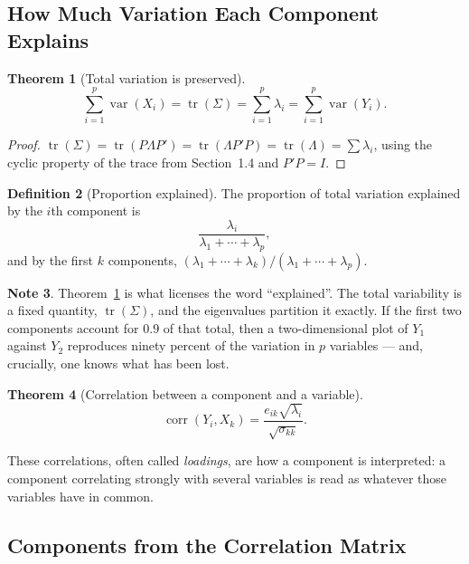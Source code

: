 \documentclass[11pt,a4paper]{article}
\theoremstyle{definition}
\newtheorem{thm}{Theorem}[section]
\newtheorem{defn}[thm]{Definition}
\newtheorem{note}[thm]{Note}
\begin{document}
\subsection{How Much Variation Each Component Explains}

\begin{thm}[Total variation is preserved]
\label{thm:pcatrace}
$$\sum^{p}_{i=1}\operatorname{var}(X_i)
= \operatorname{tr}(\Sigma)
= \sum^{p}_{i=1}\lambda_i
= \sum^{p}_{i=1}\operatorname{var}(Y_i).$$
\end{thm}

\begin{proof}
$\operatorname{tr}(\Sigma) = \operatorname{tr}(P\Lambda P')
= \operatorname{tr}(\Lambda P'P) = \operatorname{tr}(\Lambda)
= \sum\lambda_i$, using the cyclic property of the trace from
Section~1.4 and $P'P=I$.
\end{proof}

\begin{defn}[Proportion explained]
The proportion of total variation explained by the $i$th component is
$$\frac{\lambda_i}{\lambda_1+\cdots+\lambda_p},$$
and by the first $k$ components,
$\left(\lambda_1+\cdots+\lambda_k\right)/\left(\lambda_1+\cdots+\lambda_p\right)$.
\end{defn}

\begin{note}
Theorem~\ref{thm:pcatrace} is what licenses the word ``explained''. The total
variability is a fixed quantity, $\operatorname{tr}(\Sigma)$, and the
eigenvalues partition it exactly. If the first two components account for
$0.9$ of that total, then a two-dimensional plot of $Y_1$ against $Y_2$
reproduces ninety percent of the variation in $p$ variables --- and, crucially,
one knows what has been lost.
\end{note}

\begin{thm}[Correlation between a component and a variable]
$$\operatorname{corr}\left(Y_i, X_k\right)
= \frac{e_{ik}\sqrt{\lambda_i}}{\sqrt{\sigma_{kk}}}.$$
\end{thm}

These correlations, often called \emph{loadings}, are how a component is
interpreted: a component correlating strongly with several variables is read as
whatever those variables have in common.

\subsection{Components from the Correlation Matrix}
\end{document}
